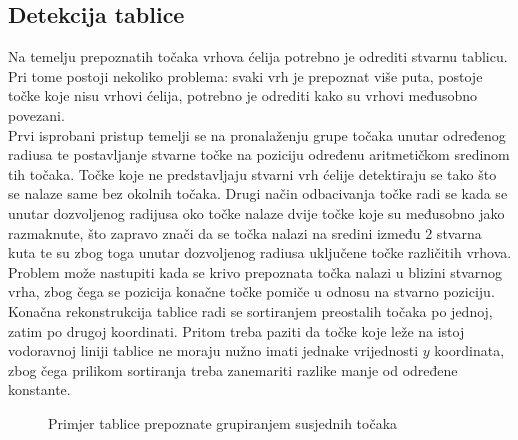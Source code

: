 \documentclass[times, utf8, zavrsni, numeric]{fer}
\begin{document}
\subsection{Detekcija tablice}
Na temelju prepoznatih točaka vrhova ćelija potrebno je odrediti stvarnu tablicu.
Pri tome postoji nekoliko problema: svaki vrh je prepoznat više puta, postoje točke koje nisu vrhovi ćelija, potrebno je odrediti kako su vrhovi međusobno povezani.\\

Prvi isprobani pristup temelji se na pronalaženju grupe točaka unutar određenog radiusa te postavljanje stvarne točke na poziciju određenu aritmetičkom sredinom tih točaka.
Točke koje ne predstavljaju stvarni vrh ćelije detektiraju se tako što se nalaze same bez okolnih točaka.
Drugi način odbacivanja točke radi se kada se unutar dozvoljenog radijusa oko točke nalaze dvije točke koje su međusobno jako razmaknute, što zapravo znači da se točka nalazi na sredini između $2$ stvarna kuta te su zbog toga unutar dozvoljenog radiusa uključene točke različitih vrhova.
Problem može nastupiti kada se krivo prepoznata točka nalazi u blizini stvarnog vrha, zbog čega se pozicija konačne točke pomiče u odnosu na stvarno poziciju.\\

Konačna rekonstrukcija tablice radi se sortiranjem preostalih točaka po jednoj, zatim po drugoj koordinati.
Pritom treba paziti da točke koje leže na istoj vodoravnoj liniji tablice ne moraju nužno imati jednake vrijednosti $y$ koordinata, zbog čega prilikom sortiranja treba zanemariti razlike manje od određene konstante.\\
\begin{figure}[!ht]
    \centering
    \captionsetup{justification=centering}
    \caption{Primjer tablice prepoznate grupiranjem susjednih točaka}
    \label{fig:tableV1}
\end{figure}
\end{document}
